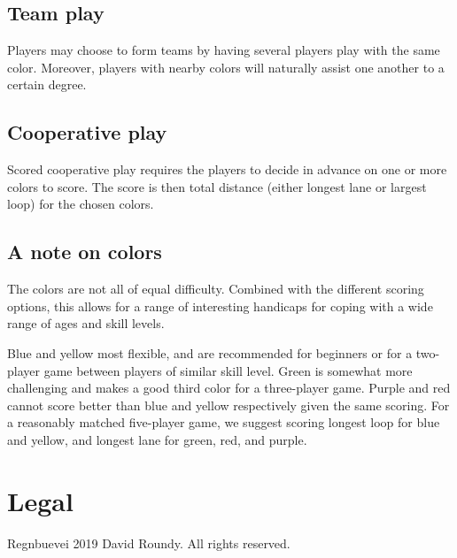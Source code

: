 \documentclass[twocolumn, 11pt]{article}
\begin{document}
\subsection*{Team play}
Players may choose to form teams by having several players play with
the same color.  Moreover, players with nearby colors will naturally
assist one another to a certain degree.
\subsection*{Cooperative play}
Scored cooperative play requires the players to decide in advance on
one or more colors to score.  The score is then total distance (either
longest lane or largest loop) for the chosen colors.

\subsection*{A note on colors}
The colors are not all of equal difficulty.  Combined with the
different scoring options, this allows for a range of interesting
handicaps for coping with a wide range of ages and skill levels.

Blue and yellow most flexible, and are recommended for
beginners or for a two-player game between players of similar skill
level.  Green is somewhat more challenging and makes a good third
color for a three-player game.  Purple and red cannot score better
than blue and yellow respectively given the same scoring.  For a
reasonably matched five-player game, we suggest scoring longest loop
for blue and yellow, and longest lane for green, red, and purple.

\section{Legal}
Regnbuevei 2019 David Roundy. All rights reserved.
\end{document}
